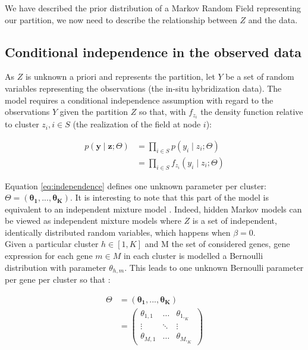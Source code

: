 We have described the prior distribution of a Markov Random Field representing our partition, we now need to describe the relationship between $Z$ and the data.

\subsection{Conditional independence in the observed data}
As $Z$ is unknown a priori and represents the partition, let $Y$ be a set of random variables representing the observations (the in-situ hybridization data). The model requires a conditional independence assumption with regard to the observations $Y$ given the partition $Z$ so that, with $f_{z_i}$ the density function relative to cluster $z_i, i \in S$ (the realization of the field at node $i$):

\begin{align}
p(\boldsymbol{y} \mid \boldsymbol{z} ; \Theta) &= \prod_{i \in S} p(y_i \mid z_i ; \Theta) \nonumber\\
\label{eq:independence}
&= \prod_{i \in S} f_{z_i} (y_i \mid z_i ; \Theta)
\end{align}

Equation \ref{eq:independence} defines one unknown parameter per cluster: $\Theta = (\boldsymbol{\theta_1},...,\boldsymbol{\theta_K})$. It is interesting to note that this part of the model is equivalent to an independent mixture model \cite{Mclachlan04}. Indeed, hidden Markov models can be viewed as independent mixture models where $Z$ is a set of independent, identically distributed random variables, which happens when $\beta = 0$.\\

Given a particular cluster $h \in [1,K]$ and M the set of considered genes, gene expression for each gene $m \in M$ in each cluster is modelled a Bernoulli distribution with parameter $\theta_{h,m}$. This leads to one unknown Bernoulli parameter per gene per cluster so that :

\begin{align*}
\Theta &= (\boldsymbol{\theta_1},...,\boldsymbol{\theta_K})\\
&= \left( \begin{array} {ccc}
\theta_{1,1} & \ldots  & \theta_{1,_K}\\
\vdots & \ddots & \vdots\\
\theta_{M,1} & \ldots & \theta_{M,_K} \end{array} \right)
\end{align*}

